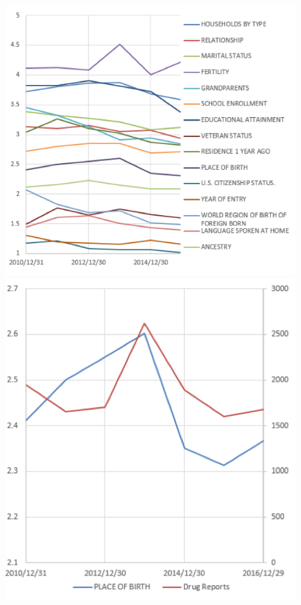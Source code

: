 \documentclass[12pt]{article}
\begin{document}
\begin{figure}[H]
	\centering %
	\begin{minipage}[b]{0.48\textwidth} %
		\centering %
		\includegraphics[scale=0.8]{./figures/9.png} %
		\caption{}
		\label{Fig9}
	\end{minipage}
	\begin{minipage}[b]{0.48\textwidth} %
		\centering %
		\includegraphics[scale=0.8]{./figures/10.png}%
		\caption{}
		\label{Fig10}
	\end{minipage}
\end{figure}
\end{document}
